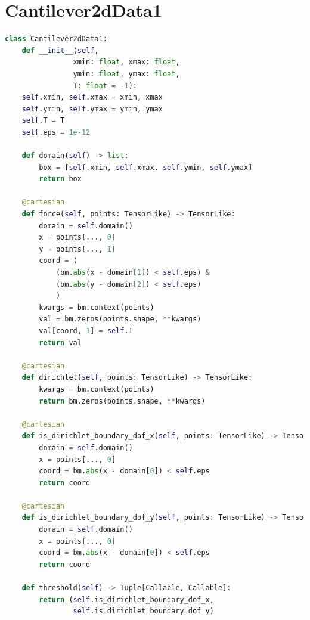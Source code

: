 \documentclass[mathpazo]{cicp}
\begin{document}
\section{Cantilever2dData1}
\label{sec:code_canti_2d}
\begin{lstlisting}[language=python]
class Cantilever2dData1:
	def __init__(self, 
				xmin: float, xmax: float, 
				ymin: float, ymax: float,
				T: float = -1):
	self.xmin, self.xmax = xmin, xmax
	self.ymin, self.ymax = ymin, ymax
	self.T = T 
	self.eps = 1e-12
	
	def domain(self) -> list:
		box = [self.xmin, self.xmax, self.ymin, self.ymax]
		return box
	
	@cartesian
	def force(self, points: TensorLike) -> TensorLike:
		domain = self.domain()
		x = points[..., 0]
		y = points[..., 1]
		coord = (
			(bm.abs(x - domain[1]) < self.eps) & 
			(bm.abs(y - domain[2]) < self.eps)
			)
		kwargs = bm.context(points)
		val = bm.zeros(points.shape, **kwargs)
		val[coord, 1] = self.T
		return val
	
	@cartesian
	def dirichlet(self, points: TensorLike) -> TensorLike:
		kwargs = bm.context(points)
		return bm.zeros(points.shape, **kwargs)
	
	@cartesian
	def is_dirichlet_boundary_dof_x(self, points: TensorLike) -> TensorLike:
		domain = self.domain()
		x = points[..., 0]
		coord = bm.abs(x - domain[0]) < self.eps
		return coord
	
	@cartesian
	def is_dirichlet_boundary_dof_y(self, points: TensorLike) -> TensorLike:
		domain = self.domain()
		x = points[..., 0]
		coord = bm.abs(x - domain[0]) < self.eps
		return coord    
	
	def threshold(self) -> Tuple[Callable, Callable]:
		return (self.is_dirichlet_boundary_dof_x, 
				self.is_dirichlet_boundary_dof_y)
\end{lstlisting}
\end{document}
